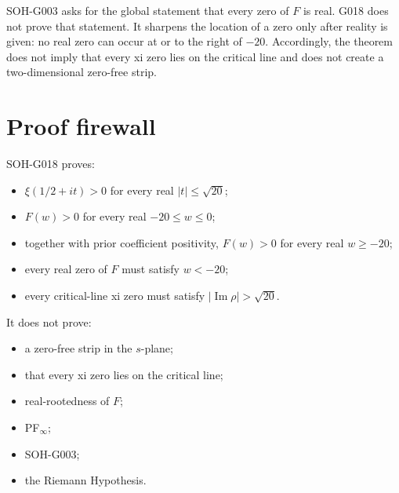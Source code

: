 SOH-G003 asks for the global statement that every zero of $F$ is real.  G018
does not prove that statement.  It sharpens the location of a zero only after
reality is given: no real zero can occur at or to the right of $-20$.
Accordingly, the theorem does not imply that every xi zero lies on the
critical line and does not create a two-dimensional zero-free strip.

\section{Proof firewall}

SOH-G018 proves:
\begin{itemize}
 \item $\xi(1/2+it)>0$ for every real $|t|\le\sqrt{20}$;
 \item $F(w)>0$ for every real $-20\le w\le0$;
 \item together with prior coefficient positivity, $F(w)>0$ for every real
       $w\ge-20$;
 \item every real zero of $F$ must satisfy $w<-20$;
 \item every critical-line xi zero must satisfy
       $|\operatorname{Im}\rho|>\sqrt{20}$.
\end{itemize}

It does not prove:
\begin{itemize}
 \item a zero-free strip in the $s$-plane;
 \item that every xi zero lies on the critical line;
 \item real-rootedness of $F$;
 \item PF$_\infty$;
 \item SOH-G003;
 \item the Riemann Hypothesis.
\end{itemize}
